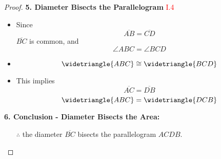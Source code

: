\begin{proof}
\clearpage

\textbf{5. Diameter Bisects the Parallelogram} \hfill\textcolor{red}{ I.4}
\begin{itemize}
    \item Since 
    \[\overline{AB} = \overline{CD}\] 
    $\overline{BC}$ is common, and 
    \[\angle{ABC} = \angle{BCD}\]
     
    \item 
    \[\widetriangle{ABC} \cong \widetriangle{BCD}\]
    
    \item This implies 
    \[\overline{AC} = \overline{DB}\]
    \[ \widetriangle{ABC} = \widetriangle{DCB}\]
\end{itemize}

\textbf{6. Conclusion - Diameter Bisects the Area:}
\begin{itemize}
    \item[$\therefore$] the diameter $\overline{BC}$ bisects the parallelogram $ACDB$.
\end{itemize}

\end{proof}

\clearpage
